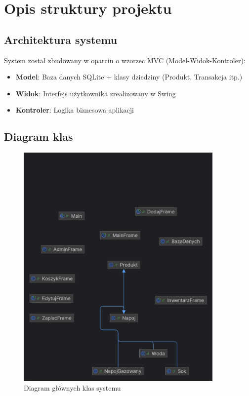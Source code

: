 \section{Opis struktury projektu}
\subsection{Architektura systemu}
System został zbudowany w oparciu o wzorzec MVC (Model-Widok-Kontroler):
\begin{itemize}
\item \textbf{Model}: Baza danych SQLite + klasy dziedziny (Produkt, Transakcja itp.)
\item \textbf{Widok}: Interfejs użytkownika zrealizowany w Swing
\item \textbf{Kontroler}: Logika biznesowa aplikacji
\end{itemize}

\subsection{Diagram klas}
\begin{figure}[H]
\centering
\includegraphics[width=0.9\textwidth]{figures/class_diagram.png}
\caption{Diagram głównych klas systemu}
\label{fig:class_diagram}
\end{figure}



